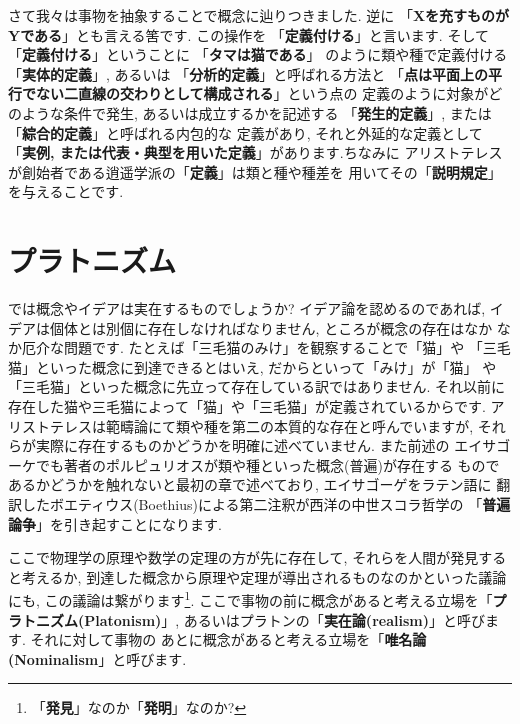 \documentclass[b5j,8pt,twocolumn]{ltjsarticle}
\begin{document}
さて我々は事物を抽象することで概念に辿りつきました. 逆に
「\textbf{Xを充すものがYである}」とも言える筈です. この操作を
「\textbf{定義付ける}」と言います. そして「\textbf{定義付ける}」ということに
「\textbf{タマは猫である}」 のように類や種で定義付ける「\textbf{実体的定義}」,
 あるいは 「\textbf{分析的定義}」と呼ばれる方法と
「\textbf{点は平面上の平行でない二直線の交わりとして構成される}」という点の
定義のように対象がどのような条件で発生, あるいは成立するかを記述する
「\textbf{発生的定義}」, または 「\textbf{綜合的定義}」と呼ばれる内包的な
定義があり, それと外延的な定義として
「\textbf{実例, または代表・典型を用いた定義}」があります.ちなみに
アリストテレスが創始者である逍遥学派の「\textbf{定義}」は類と種や種差を
用いてその「\textbf{説明規定}」を与えることです.


\section{プラトニズム}


では概念やイデアは実在するものでしょうか? イデア論を認めるのであれば,
 イデアは個体とは別個に存在しなければなりません, ところが概念の存在はなか
なか厄介な問題です. たとえば「三毛猫のみけ」を観察することで「猫」や
「三毛猫」といった概念に到達できるとはいえ, だからといって「みけ」が「猫」
や「三毛猫」といった概念に先立って存在している訳ではありません. それ以前に
存在した猫や三毛猫によって「猫」や「三毛猫」が定義されているからです.
 アリストテレスは範疇論にて類や種を第二の本質的な存在と呼んでいますが,
 それらが実際に存在するものかどうかを明確に述べていません. また前述の
エイサゴーケでも著者のポルピュリオスが類や種といった概念(普遍)が存在する
ものであるかどうかを触れないと最初の章で述べており, エイサゴーゲをラテン語に
翻訳したボエティウス(Boethius)による第二注釈が西洋の中世スコラ哲学の
「\textbf{普遍論争}」を引き起すことになります\cite{普遍論争}.
\newline


ここで物理学の原理や数学の定理の方が先に存在して, それらを人間が発見する
と考えるか, 到達した概念から原理や定理が導出されるものなのかといった議論にも,
 この議論は繋がります\footnote{「\textbf{発見}」なのか「\textbf{発明}」なのか?}.
 ここで事物の前に概念があると考える立場を「\textbf{プラトニズム(Platonism)}」,
 あるいはプラトンの「\textbf{実在論(realism)}」と呼びます. それに対して事物の
あとに概念があると考える立場を「\textbf{唯名論(Nominalism}」と呼びます.
\newline
\end{document}
